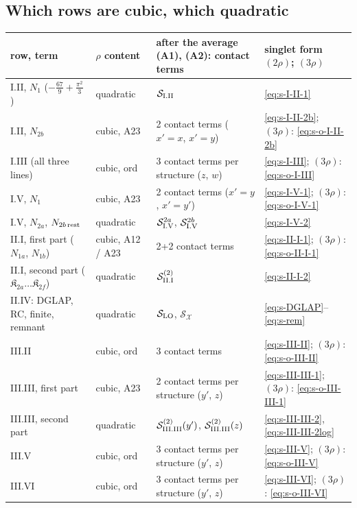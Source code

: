 \documentclass[9pt]{article}
\numberwithin{equation}{section}
\begin{document}
{\subsection{Which rows are cubic, which quadratic}
\begin{center}
\renewcommand{\arraystretch}{1.3}
\small\begin{tabular}{|l|l|l|l|}
\hline
row, term & $\rho$ content & after the average (A1), (A2): contact terms & singlet form $(2\rho)$; $(3\rho)$ \\ \hline
I.II, $N_{1}$ ($-\frac{67}{9}+\frac{\pi^{2}}{3}$) & quadratic & $\mathcal{S}_{\rm I.II}$ & \eqref{eq:s-I-II-1} \\
I.II, $N_{2b}$ & cubic, A23 & 2 contact terms ($x'{=}x$, $x'{=}y$) & \eqref{eq:s-I-II-2b}; $(3\rho)$: \eqref{eq:s-o-I-II-2b} \\
I.III (all three lines) & cubic, ord & 3 contact terms per structure ($z$, $w$) & \eqref{eq:s-I-III}; $(3\rho)$: \eqref{eq:s-o-I-III} \\
I.V, $N_{1}$ & cubic, A23 & 2 contact terms ($x'{=}y$, $x'{=}y'$) & \eqref{eq:s-I-V-1}; $(3\rho)$: \eqref{eq:s-o-I-V-1} \\
I.V, $N_{2a}$, $N_{2b\,\rm rest}$ & quadratic & $\mathcal{S}^{2a}_{\rm I.V}$, $\mathcal{S}^{2b}_{\rm I.V}$ & \eqref{eq:s-I-V-2} \\
II.I, first part ($N_{1a}$, $N_{1b}$) & cubic, A12 / A23 & 2+2 contact terms & \eqref{eq:s-II-I-1}; $(3\rho)$: \eqref{eq:s-o-II-I-1} \\
II.I, second part ($\mathfrak{K}_{2a}\dots\mathfrak{K}_{2f}$) & quadratic & $\mathcal{S}^{(2)}_{\rm II.I}$ & \eqref{eq:s-II-I-2} \\
II.IV: DGLAP, RC, finite, remnant & quadratic & $\mathcal{S}_{\rm LO}$, $\mathcal{S}_{\mathcal{X}}$ & \eqref{eq:s-DGLAP}--\eqref{eq:s-rem} \\
III.II & cubic, ord & 3 contact terms & \eqref{eq:s-III-II}; $(3\rho)$: \eqref{eq:s-o-III-II} \\
III.III, first part & cubic, A23 & 2 contact terms per structure ($y'$, $z$) & \eqref{eq:s-III-III-1}; $(3\rho)$: \eqref{eq:s-o-III-III-1} \\
III.III, second part & quadratic & $\mathcal{S}^{(2)}_{\rm III.III}(y')$, $\mathcal{S}^{(2)}_{\rm III.III}(z)$ & \eqref{eq:s-III-III-2}, \eqref{eq:s-III-III-2log} \\
III.V & cubic, ord & 3 contact terms per structure ($y'$, $z$) & \eqref{eq:s-III-V}; $(3\rho)$: \eqref{eq:s-o-III-V} \\
III.VI & cubic, ord & 3 contact terms per structure ($y'$, $z$) & \eqref{eq:s-III-VI}; $(3\rho)$: \eqref{eq:s-o-III-VI} \\ \hline

\end{tabular}
\end{center}}
\end{document}
